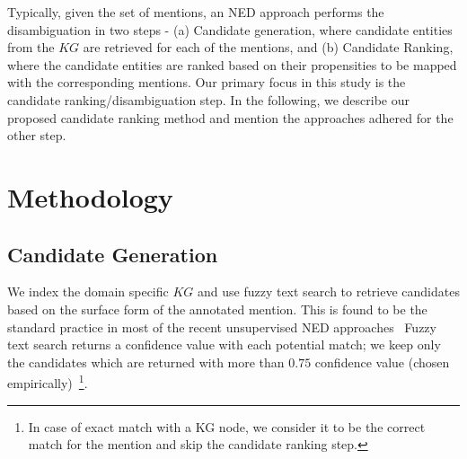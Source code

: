 \documentclass[11pt]{article}
\begin{document}
Typically, given the set of mentions, an NED approach performs the disambiguation in two steps - 
(a) Candidate generation, where candidate entities from the $KG$ are retrieved for each of the mentions, and (b) Candidate Ranking, where the candidate entities are ranked based on their propensities to be mapped with the corresponding mentions. 
Our primary focus in this study is the candidate ranking/disambiguation step. 
In the following, we describe our proposed candidate ranking method and mention the approaches adhered for the other step.

\section{Methodology}
\subsection{Candidate Generation}
We index the domain specific $KG$ and use fuzzy text search \cite{max_bachmann_2021_5584996} to retrieve candidates based on the surface form of the annotated mention. This is found to be the standard practice in most of the recent unsupervised NED approaches~\cite{yang2023b, simos2022computationally}
Fuzzy text search returns a confidence value with each potential match; we keep only the candidates which are returned with more than $0.75$ confidence value (chosen empirically)~\footnote{In case of exact match with a KG node, we consider it to be the correct match for the mention and skip the candidate ranking step.}.
\end{document}
